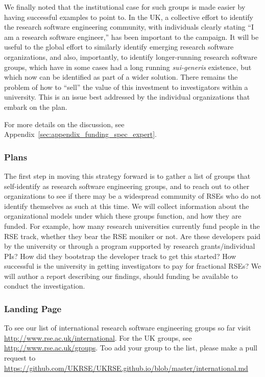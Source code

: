 We finally noted that the institutional case for such groups is made easier by
having successful examples to point to. In the UK, a collective effort to
identify the research software engineering community, with individuals clearly
stating ``I am a research software engineer,'' has been important to the
campaign. It will be useful to the global effort to similarly identify emerging
research software organizations, and also, importantly, to identify
longer-running research software groups, which have in some cases had a long
running \emph{sui-generis} existence, but which now can be identified as part of
a wider solution. There remains the problem of how to ``sell'' the value of this
investment to investigators within a university. This is an issue best addressed
by the individual organizations that embark on the plan.

For more details on the discussion, see
Appendix~\ref{sec:appendix_funding_spec_expert}.

\subsubsection{Plans}

The first step in moving this strategy forward is to gather a list of groups
that self-identify as research software engineering groups, and to reach out to
other organizations to see if there may be a widespread community of RSEs who do
not identify themselves as such at this time. We will collect information about
the organizational models under which these groups function, and how they are
funded. For example, how many research universities currently fund people in the
RSE track, whether they bear the RSE moniker or not. Are these developers paid
by the university or through a program supported by research grants/individual
PIs? How did they bootstrap the developer track to get this started? How
successful is the university in getting investigators to pay for fractional
RSEs? We will author a report describing our findings, should funding be
available to conduct the investigation.

\subsubsection{Landing Page}

To see our list of international research software engineering groups so far
visit \url{http://www.rse.ac.uk/international}. For the UK groups, see
\url{http://www.rse.ac.uk/groups}. Too add your group to the list, please make a pull request to
\url{https://github.com/UKRSE/UKRSE.github.io/blob/master/international.md}
